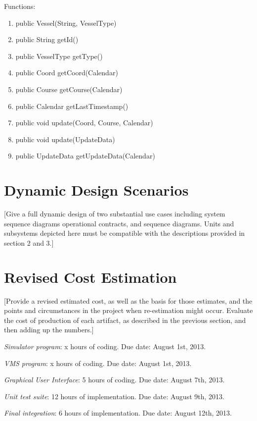 \documentclass{article}
\begin{document}
\vspace{0.5cm}

Functions:
\begin{enumerate}
	\item public Vessel(String, VesselType)
	\item public String getId()
	\item public VesselType getType()
	\item public Coord getCoord(Calendar)
	\item public Course getCourse(Calendar)
	\item public Calendar getLastTimestamp()
	\item public void update(Coord, Course, Calendar)
	\item public void update(UpdateData)
	\item public UpdateData getUpdateData(Calendar)
\end{enumerate}


\section{Dynamic Design Scenarios} %

[Give a full dynamic design of two substantial use cases including system sequence diagrams operational contracts, and sequence diagrams. Units and subsystems depicted here must be compatible with the descriptions provided in section 2 and 3.]

\section{Revised Cost Estimation} %

[Provide a revised estimated cost, as well as the basis for those estimates, and the points and circumstances in the project when re-estimation might occur.
Evaluate the cost of production of each artifact, as described in the previous section, and then adding up the numbers.]

\vspace{0.5cm}

\emph{Simulator program}: x hours of coding. Due date: August 1st, 2013.

\emph{VMS program}: x hours of coding. Due date: August 1st, 2013.

\emph{Graphical User Interface}: 5 hours of coding. Due date: August 7th, 2013.

\emph{Unit test suite}: 12 hours of implementation. Due date: August 9th, 2013.

\emph{Final integration}: 6 hours of implementation. Due date: August 12th, 2013.
\end{document}
